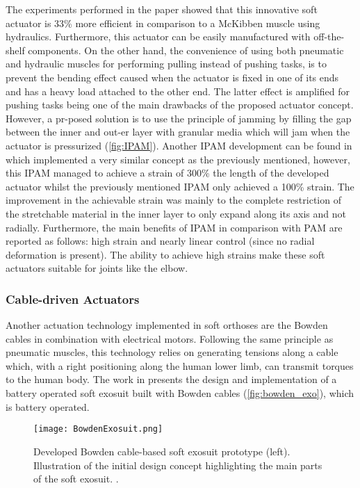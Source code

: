 The experiments performed in the paper showed that this innovative soft actuator is 33\% more efficient in comparison to a McKibben muscle using hydraulics. Furthermore, this actuator can be easily manufactured with off-the-shelf components. On the other hand, the convenience of using both pneumatic and hydraulic muscles for performing pulling instead of pushing tasks, is to prevent the bending effect caused when the actuator is fixed in one of its ends and has a heavy load attached to the other end. The latter effect is amplified for pushing tasks being one of the main drawbacks of the proposed actuator concept. However, a pr-posed solution is to use the principle of jamming by filling the gap between the inner and out-er layer with granular media which will jam when the actuator is pressurized (\autoref{fig:IPAM}). Another IPAM development can be found in \cite{Hawkes2016} which implemented a very similar concept as the previously mentioned, however, this IPAM managed to achieve a strain of 300\% the length of the developed actuator whilst the previously mentioned IPAM only achieved a 100\% strain. The improvement in the achievable strain was mainly to the complete restriction of the stretchable material in the inner layer to only expand along its axis and not radially. Furthermore, the main benefits of IPAM in comparison with PAM are reported as follows: high strain and nearly linear control (since no radial deformation is present). The ability to achieve high strains make these soft actuators suitable for joints like the elbow.

\subsubsection{Cable-driven Actuators} \label{sec:cable-driven}

Another actuation technology implemented in soft orthoses are the Bowden cables in combination with electrical motors. Following the same principle as pneumatic muscles, this technology relies on generating tensions along a cable which, with a right positioning along the human lower limb, can transmit torques to the human body. The work in \cite{asbeck2013biologically} presents the design and implementation of a battery operated soft exosuit built with Bowden cables (\autoref{fig:bowden_exo}), which is battery operated. 
\begin{figure}[hbtp!]
    \centering
    \texttt{[image: BowdenExosuit.png]}
    \caption{Developed Bowden cable-based soft exosuit prototype (left). Illustration of the initial design concept highlighting the main parts of the soft exosuit. \cite{asbeck2013biologically}. }
    \label{fig:bowden_exo}
\end{figure}

